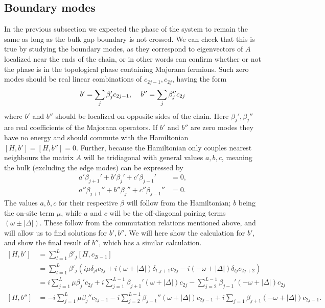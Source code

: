 \subsection{Boundary modes}
In the previous subsection we expected the phase of the system to remain the same as long as the bulk gap boundary is not crossed. We can check that this is true by studying the boundary modes, as they correspond to eigenvectors of $A$ localized near the ends of the chain, or in other words can confirm whether or not the phase is in the topological phase containing Majorana fermions. Such zero modes should be real linear combinations of $c_{2j-1}, c_{2j}$, having the form
\begin{align}
    b' = \sum_j \beta_j' c_{2j-1}, \hspace{4mm} b'' = \sum_j \beta_j'' c_{2j}
\end{align}
where $b'$ and $b''$ should be localized on opposite sides of the chain. Here $\beta_j', \beta_j''$ are real coefficients of the Majorana operators. If $b'$ and $b''$ are zero modes they have no energy and should commute with the Hamiltonian $\left[H, b'\right] = \left[H, b''\right] = 0$. Further, because the Hamiltonian only couples nearest neighbours the matrix $A$ will be tridiagonal with general values $a, b, c$, meaning the bulk (excluding the edge modes) can be expressed by
\begin{align}
    a' \beta_{j+1}' + b' \beta_j' + c' \beta_{j-1}' &= 0, \\
    a'' \beta_{j+1}'' + b'' \beta_j'' + c'' \beta_{j-1}'' &= 0.
\end{align}
The values $a, b, c$ for their respective $\beta$ will follow from the Hamiltonian; $b$ being the on-site term $\mu$, while $a$ and $c$ will be the off-diagonal pairing terms $(\omega \pm |\Delta|)$. These follow from the commutation relations mentioned above, and will allow us to find solutions for $b', b''$. We will here show the calculation for $b'$, and show the final result of $b''$, which has a similar calculation.
\begin{align}
    \left[H, b'\right] &= \sum_{l=1}^L \beta'_j \left[H, c_{2l-1}\right]\\
    &= \sum_{l=1}^L \beta'_j \left( i \mu \delta_{jl} c_{2j} + i (\omega + |\Delta|) \delta_{l, j+1} c_{2j} - i (- \omega + |\Delta|) \delta_{lj} c_{2j+2}\right)\\
    &= i \sum_{j=1}^L \mu \beta_j' c_{2j} + i \sum_{j=1}^{L-1} \beta_{j+1}' (\omega + |\Delta|) c_{2j} - \sum_{j=2}^{L-1} \beta_{j-1}' (-\omega + |\Delta|)c_{2j} \\
    \left[H, b'' \right] &= -i \sum_{j=1}^L \mu \beta_{j}'' c_{2j-1} - i \sum_{j=2}^{L-1} \beta_{j-1}'' (\omega + |\Delta|) c_{2j-1} + i \sum_{j=1} \beta_{j+1} (-\omega + |\Delta|) c_{2j-1}.
\end{align}
